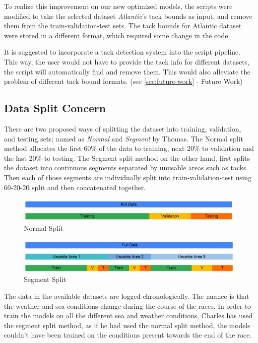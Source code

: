 \documentclass[12pt,twoside]{report}
\begin{document}
To realize this improvement on our new optimized models, the scripts were modified to take the selected dataset \textit{Atlantic}'s tack bounds as input, and remove them from the train-validation-test sets. The tack bounds for Atlantic dataset were stored in a different format, which required some change in the code.

It is suggested to incorporate a tack detection system into the script pipeline. This way, the user would not have to provide the tack info for different datasets, the script will automatically find and remove them. This would also alleviate the problem of different tack bound formats. (see \ref{sec:future-work} - Future Work)

\subsection{Data Split Concern} \label{sec:data-split-concern}

There are two proposed ways of splitting the dataset into training, validation, and testing sets; named as \emph{Normal} and \emph{Segment} by Thomas. The Normal split method allocates the first 60\% of the data to training, next 20\% to validation and the last 20\% to testing. The Segment split method on the other hand, first splits the dataset into continuous segments separated by unusable areas such as tacks. Then each of those segments are individually split into train-validation-test using 60-20-20 split and then concatenated together.

\begin{figure}[h]
\centering
\includegraphics[width = \hsize]{figures/Contribution/Normal Split.png}
\caption{Normal Split}
\end{figure}

\begin{figure}[h]
\centering
\includegraphics[width = \hsize]{figures/Contribution/Segment Split.png}
\caption{Segment Split}
\end{figure}

The data in the available datasets are logged chronologically. The nuance is that the weather and sea conditions change during the course of the races. In order to train the models on all the different sea and weather conditions, Charles has used the segment split method, as if he had used the normal split method, the models couldn't have been trained on the conditions present towards the end of the race.
\end{document}
